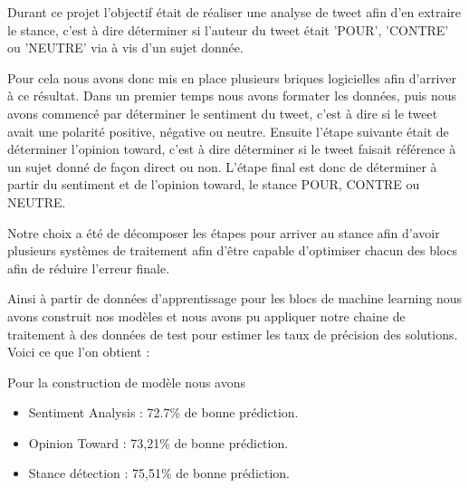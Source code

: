\par Durant ce projet l'objectif était de réaliser une analyse de tweet afin d'en extraire le stance, c'est à dire déterminer si l'auteur du tweet était 'POUR', 'CONTRE' ou 'NEUTRE' via à vis d'un sujet donnée. \\

\par Pour cela nous avons donc mis en place plusieurs briques logicielles afin d'arriver à ce résultat. Dans un premier temps nous avons formater les données, puis nous avons commencé par déterminer le sentiment du tweet, c'est à dire si le tweet avait une polarité positive, négative ou neutre. Ensuite l'étape suivante était de déterminer l'opinion toward, c'est à dire déterminer si le tweet faisait référence à un sujet donné de façon direct ou non. L'étape final est donc de déterminer à partir du sentiment et de l'opinion toward, le stance POUR, CONTRE ou NEUTRE. \\

\par Notre choix a été de décomposer les étapes pour arriver au stance afin d'avoir plusieurs systèmes de traitement afin d'être capable d'optimiser chacun des blocs afin de réduire l'erreur finale. 

\par Ainsi à partir de données d'apprentissage pour les blocs de machine learning nous avons construit nos modèles et nous avons pu appliquer notre chaine de traitement à des données de test pour estimer les taux de précision des solutions. Voici ce que l'on obtient : \\

\par Pour la construction de modèle nous avons 
\begin{itemize}
	\item Sentiment Analysis : 72.7\% de bonne prédiction.
	\item Opinion Toward : 73,21\%  de bonne prédiction.
	\item Stance détection : 75,51\% de bonne prédiction.
\end{itemize}